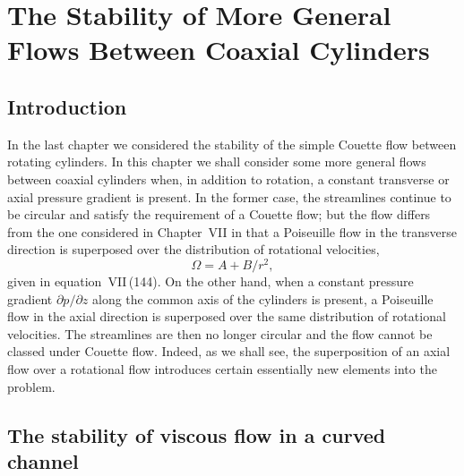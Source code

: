 \chapter{The Stability of More General Flows Between Coaxial Cylinders}
\label{ch:8}

\section{Introduction}
\label{sec:75}

In the last chapter we considered the stability of the simple Couette flow between rotating cylinders. In this chapter we shall consider some more general flows between coaxial cylinders when, in addition to rotation, a constant transverse or axial pressure gradient is present. In the former case, the streamlines continue to be circular and satisfy the requirement of a Couette flow; but the flow differs from the one considered in Chapter~VII in that a Poiseuille flow in the transverse direction is superposed over the distribution of rotational velocities,
\begin{equation}
\label{eq:8-1}
\Omega = A + B/r^2,
\end{equation}
given in equation~VII\,(144). On the other hand, when a constant pressure gradient $\partial p/\partial z$ along the common axis of the cylinders is present, a Poiseuille flow in the axial direction is superposed over the same distribution of rotational velocities. The streamlines are then no longer circular and the flow cannot be classed under Couette flow. Indeed, as we shall see, the superposition of an axial flow over a rotational flow introduces certain essentially new elements into the problem.

\section{The stability of viscous flow in a curved channel}
\label{sec:76}

